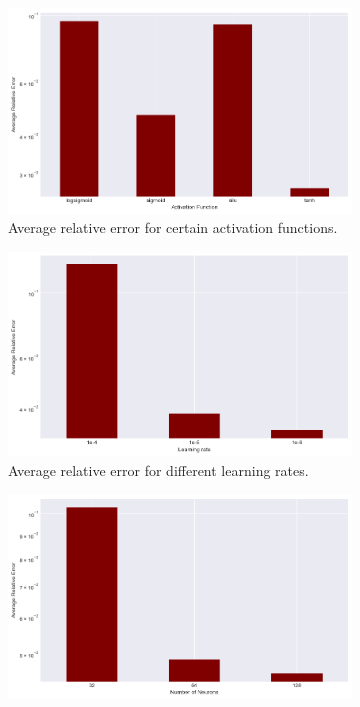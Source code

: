 \begin{figure}
\centering
\begin{subfigure}{.5\textwidth}
\centering
\includegraphics[width=1\linewidth]{imgs/function-error-expdisc.png}
\caption{Average relative error for certain activation functions.}
\label{fig:function-error-expdisc}
\end{subfigure}%
\begin{subfigure}{.5\textwidth}
\centering
\includegraphics[width=1\linewidth]{imgs/learning-rate-expdisc.png}
\caption{Average relative error for different learning rates.}
\label{fig:learning-rate-expdisc}
\end{subfigure}
\begin{subfigure}{.5\textwidth}
\centering
\includegraphics[width=1\linewidth]{imgs/neurons-error-expdisc.png}

\end{subfigure}
\end{figure}
